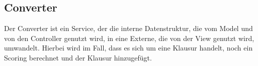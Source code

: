 \subsection{Converter}\label{subsec:converter}
Der Converter ist ein Service, der die interne Datenstruktur, die vom Model und von den Controller genutzt wird,
in eine Externe, die von der View genutzt wird, umwandelt.
Hierbei wird im Fall, dass es sich um eine Klausur handelt, noch ein Scoring berechnet und der Klausur hinzugefügt.
